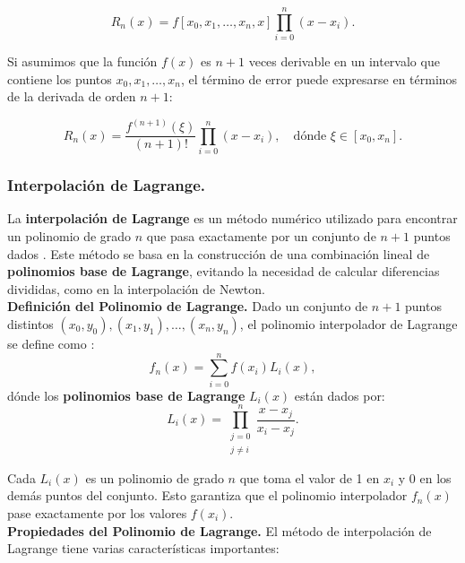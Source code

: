 \documentclass{article}
\begin{document}
\begin{equation}
R_n(x) = f[x_0, x_1, \dots, x_n, x] \prod_{i=0}^{n} (x - x_i).
\end{equation}

Si asumimos que la función $f(x)$ es $n+1$ veces derivable en un intervalo que contiene los puntos $x_0, x_1, \dots, x_n$, el término de error puede expresarse en términos de la derivada de orden $n+1$:

\begin{equation}
R_n(x) = \frac{f^{(n+1)}(\xi)}{(n+1)!} \prod_{i=0}^{n} (x - x_i), \quad \text{dónde } \xi \in [x_0, x_n].
\end{equation}


\subsubsection{Interpolación de Lagrange.}
\label{subsec:lagrange}
La \textbf{interpolación de Lagrange} es un método numérico utilizado para encontrar un polinomio de grado $n$ que pasa exactamente por un conjunto de $n+1$ puntos dados \cite{lagrange1, lagrange2}. Este método se basa en la construcción de una combinación lineal de \textbf{polinomios base de Lagrange}, evitando la necesidad de calcular diferencias divididas, como en la interpolación de Newton.\\

\noindent \textbf{Definición del Polinomio de Lagrange.}  
Dado un conjunto de $n+1$ puntos distintos $(x_0, y_0), (x_1, y_1), \dots, (x_n, y_n)$, el polinomio interpolador de Lagrange se define como \cite{lagrange3}:
\begin{equation}
f_n(x) = \sum_{i=0}^{n} f(x_i) L_i(x),
\end{equation}
dónde los \textbf{polinomios base de Lagrange} $L_i(x)$ están dados por:
\begin{equation}
L_i(x) = \prod_{\substack{j=0 \\ j\neq i}}^n \frac{x - x_j}{x_i - x_j}.
\end{equation}

Cada $L_i(x)$ es un polinomio de grado  $n$ que toma el valor de 1 en $x_i$ y 0 en los demás puntos del conjunto. Esto garantiza que el polinomio interpolador $f_n(x)$ pase exactamente por los valores $f(x_i)$.\\

\noindent \textbf{Propiedades del Polinomio de Lagrange.} El método de interpolación de Lagrange tiene varias características importantes:
\end{document}
